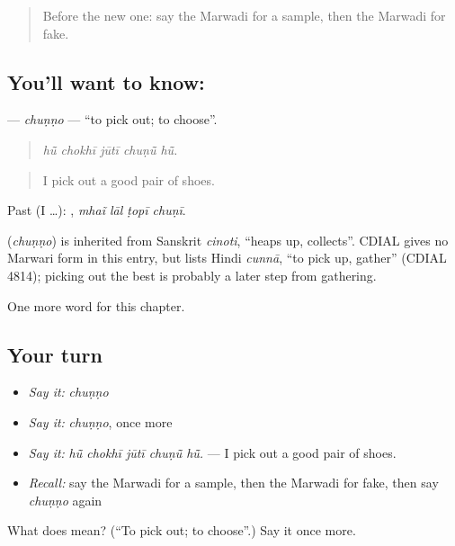 \label{lesson:MW-C210-chunno}



\begin{quote}
Before the new one: say the Marwadi for a sample, then the Marwadi for fake.
\end{quote}

\subsection*{You'll want to know: }
\textbf{} — \emph{chuṇṇo} — \textquotedblleft{}to pick out; to choose\textquotedblright{}.

\begin{quote}
    
\end{quote}

\begin{quote}
\emph{hū̃ chokhī jūtī chuṇū̃ hū̃.}
\end{quote}

\begin{quote}
I pick out a good pair of shoes.
\end{quote}

Past (I …):    , \emph{mhaĩ lāl ṭopī chuṇī}.

\begin{cousinweb}
\textbf{} (\emph{chuṇṇo}) is inherited from Sanskrit \emph{cinoti}, \textquotedblleft{}heaps up, collects\textquotedblright{}. CDIAL gives no Marwari form in this entry, but lists Hindi \emph{cunnā}, \textquotedblleft{}to pick up, gather\textquotedblright{} (CDIAL 4814); picking out the best is probably a later step from gathering.
\end{cousinweb}

\begin{grammarlens}[title={What you've built}]
One more word for this chapter.
\end{grammarlens}

\subsection*{Your turn}
\begin{itemize}
\raggedright
  \item \emph{Say it:} \emph{chuṇṇo}
  \item \emph{Say it:} \emph{chuṇṇo}, once more
  \item \emph{Say it:} \emph{hū̃ chokhī jūtī chuṇū̃ hū̃.} — I pick out a good pair of shoes.
  \item \emph{Recall:} say the Marwadi for a sample, then the Marwadi for fake, then say \emph{chuṇṇo} again
\end{itemize}

\begin{tcolorbox}[breakable,colback=teal!4,colframe=teal!35!black,title={Before you move on}]
What does  mean? (\textquotedblleft{}To pick out; to choose\textquotedblright{}.) Say it once more.
\end{tcolorbox}
